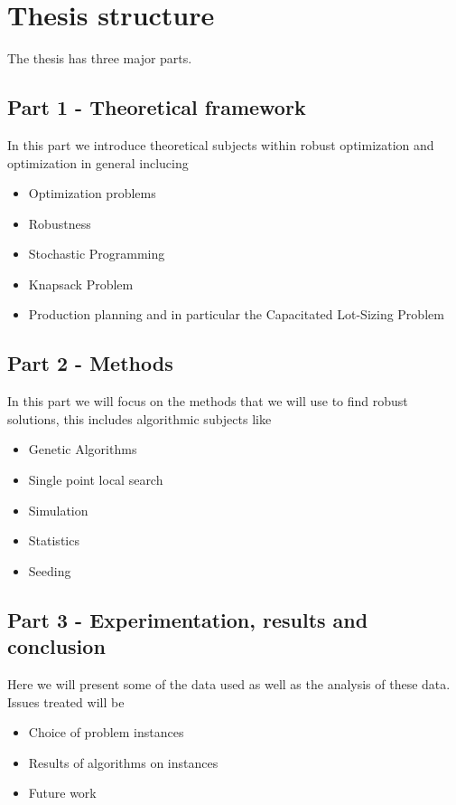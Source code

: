 \section{Thesis structure}

The thesis has three major parts.

\subsection*{Part 1 - Theoretical framework}
In this part we introduce theoretical subjects within robust optimization and optimization in general inclucing
\begin{itemize}
\item Optimization problems
\item Robustness
\item Stochastic Programming
\item Knapsack Problem
\item Production planning and in particular the Capacitated Lot-Sizing Problem
\end{itemize}

\subsection*{Part 2 - Methods}
In this part we will focus on the methods that we will use to find
robust solutions, this includes algorithmic subjects like
\begin{itemize}
\item Genetic Algorithms
\item Single point local search
\item Simulation
\item Statistics
\item Seeding
\end{itemize}

\subsection*{Part 3 - Experimentation, results and conclusion}
Here we will present some of the data used as well as the analysis of
these data. Issues treated will be
\begin{itemize}
\item Choice of problem instances
\item Results of algorithms on instances
\item Future work
\end{itemize}


